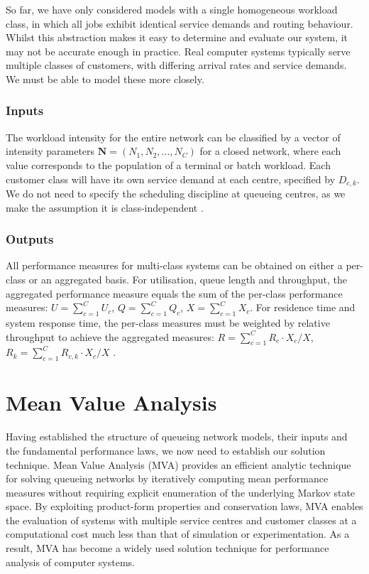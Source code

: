 So far, we have only considered models with a single homogeneous workload class, in which all jobs exhibit identical service demands and routing behaviour. Whilst this abstraction makes it easy to determine and evaluate our system, it may not be accurate enough in practice. Real computer systems typically serve multiple classes of customers, with differing arrival rates and service demands. We must be able to model these more closely.

\subsubsection*{Inputs}

The workload intensity for the entire network can be classified by a vector of intensity parameters $\mathbf{N} = (N_1, N_2, \ldots, N_C)$ for a closed network, where each value corresponds to the population of a terminal or batch workload. Each customer class will have its own service demand at each centre, specified by $D_{c,k}$. We do not need to specify the scheduling discipline at queueing centres, as we make the assumption it is class-independent \cite{lazowska84}.

\subsubsection*{Outputs}

All performance measures for multi-class systems can be obtained on either a per-class or an aggregated basis. For utilisation, queue length and throughput, the aggregated performance measure equals the sum of the per-class performance measures: $U = \sum_{c=1}^{C} U_c$, $Q = \sum_{c=1}^{C} Q_c$, $X = \sum_{c=1}^{C} X_c$. For residence time and system response time, the per-class measures must be weighted by relative throughput to achieve the aggregated measures: $R = \sum_{c=1}^{C} R_c \cdot X_c / X$, $R_k = \sum_{c=1}^{C} R_{c,k} \cdot X_c / X$ \cite{lazowska84}.




\section{Mean Value Analysis}
\label{sec:bg-mva}

Having established the structure of queueing network models, their inputs and the fundamental performance laws, we now need to establish our solution technique. Mean Value Analysis (MVA) provides an efficient analytic technique for solving queueing networks by iteratively computing mean performance measures without requiring explicit enumeration of the underlying Markov state space. By exploiting product-form properties and conservation laws, MVA enables the evaluation of systems with multiple service centres and customer classes at a computational cost much less than that of simulation or experimentation. As a result, MVA has become a widely used solution technique for performance analysis of computer systems.

